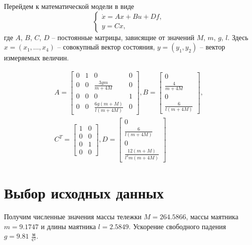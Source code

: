 Перейдем к математической модели в виде
\begin{equation}
\label{1_model_lin}
\begin{cases}
     \dot{x} = Ax + Bu + Df,\\
     y=Cx,
\end{cases}
\end{equation}
где $A$, $B$, $C$, $D$ -- постоянные матрицы, зависящие от значений $M$, $m$, $g$, $l$. Здесь $x = (x_1, \dots , x_4)$ -- совокупный вектор состояния, $y = (y_1,  y_2)$ -- вектор измеряемых величин.

\begin{multline}
    A = \begin{bmatrix}
        0 & 1 & 0 & 0\\
        0 & 0 &  \frac{3   g m}{m +4M} & 0\\
        0 & 0 & 0 & 1\\
        0 & 0 & \frac{6g( m  +  M  )}{l(m+4M)} & 0
    \end{bmatrix}, 
    B = \begin{bmatrix}
        0\\
        \frac{4}{m +4M}\\
        0\\
        \frac{6  }{l(m+4M)}
    \end{bmatrix},\\ 
    C^T = \begin{bmatrix}
        1 & 0\\
        0 & 0\\
        0 & 1\\
        0 & 0
    \end{bmatrix}, 
    D = \begin{bmatrix}
        0\\
        \frac{6 }{l(m +4M)}\\
        0\\
        \frac{12(  m + M)}{l^2m(m+4M)}
    \end{bmatrix}
\end{multline}

\section{Выбор исходных данных}

Получим численные значения массы тележки $M=264.5866$, массы маятника $m = 9.1747$ и длины маятника $l =2.5849$. Ускорение свободного падения $g = 9.81 \, \,  \frac{\text{м}}{\text{с}^2}$.

